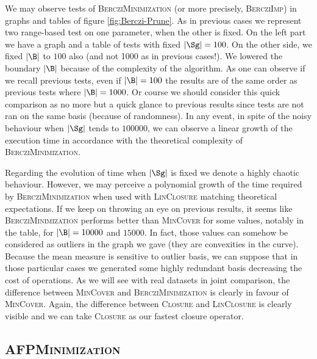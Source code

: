 We may observe tests of \textsc{BercziMinimization} (or more precisely, \textsc{BercziImp}) in graphs and tables of figure \ref{fig:Berczi-Prune}. As in previous cases we represent two range-based test on one parameter, when the other is fixed. On the left part we have a graph and a table of tests with fixed $|\Sg| = 100$. On the other side, we fixed $|\B|$ to $100$ also (and not 1000 as in previous cases!). We lowered the boundary $|\B|$ because of the complexity of the algorithm. As one can observe if we recall previous tests, even if $|\B| = 100$ the results are of the same order as previous tests where $|\B| = 1000$. Or course we should consider this quick comparison as no more but a quick glance to previous results since tests are not ran on the same basis (because of randomness). In any event, in spite of the noisy behaviour when $|\Sg|$ tends to $100000$, we can observe a linear growth of the execution time in accordance with the theoretical complexity of \textsc{BercziMinimization}.


\begin{figure}[ht]
	
\end{figure}

\vspace{1.2em}

Regarding the evolution of time when $|\Sg|$ is fixed we denote a highly chaotic
behaviour. However, we may perceive a polynomial growth of the time required by
\textsc{BercziMinimization} when used with \textsc{LinClosure} matching theoretical expectations. If we keep on throwing an eye on previous results,
it seems like \textsc{BercziMinimization} performs better than \textsc{MinCover}
for some values, notably in the table, for $|\B| = 10000$ and $15000$. In fact,
those values can somehow be considered as outliers in the graph we gave (they are convexities in the curve). Because the mean measure is sensitive to outlier
basis, we can suppose that in those particular cases we generated some highly redundant basis decreasing the cost of operations. As we will see with real datasets in joint comparison, the difference between \textsc{MinCover} and \textsc{BercziMinimization} is clearly in favour of \textsc{MinCover}. Again, the difference between \textsc{Closure} and \textsc{LinClosure} is clearly visible and we can take \textsc{Closure} as our fastest closure operator.

\subsection{\textsc{AFPMinimization}}


